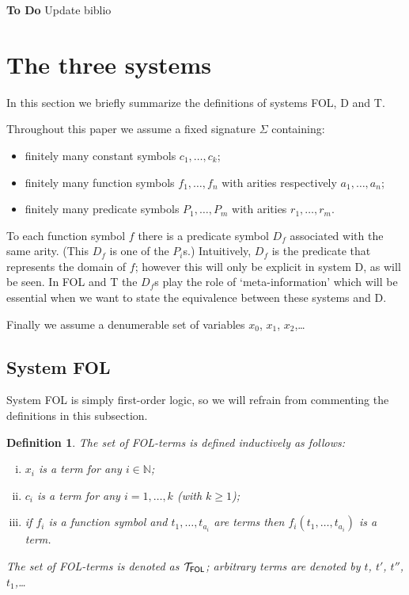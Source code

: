 \documentclass{article}
\newtheorem{definition}{Definition}[section]
\newcommand{\D}{\textsf D}
\newcommand{\T}{\textsf T}
\newcommand{\FOL}{\textsf{FOL}}
\newcommand{\NN}{\ensuremath{\mathbb N}}
\newcommand{\terms}[1]{\ensuremath{{\cal T}_{\mathsf{#1}}}}
\begin{document}
{\bf To Do} Update biblio


\section{The three systems}

In this section we briefly summarize the definitions of systems
{\FOL}, {\D} and {\T}.

Throughout this paper we assume a fixed signature $\Sigma$ containing:
\begin{itemize}
\item finitely many constant symbols $c_1,\ldots,c_k$;
\item finitely many function symbols $f_1,\ldots,f_n$ with arities
respectively $a_1,\ldots,a_n$;
\item finitely many predicate symbols $P_1,\ldots,P_m$ with arities
$r_1,\ldots,r_m$.
\end{itemize}

To each function symbol $f$ there is a predicate symbol $D_f$
associated with the same arity.  (This $D_f$ is one of the $P_i$s.)
Intuitively, $D_f$ is the predicate that represents the domain of $f$;
however this will only be explicit in system {\D}, as will be seen.
In {\FOL} and {\T} the $D_f$s play the role of `meta-information' which
will be essential when we want to state the equivalence between these
systems and {\D}.

Finally we assume a denumerable set of variables $x_0$, $x_1$, $x_2$,\ldots

\subsection{System {\FOL}}

System {\FOL} is simply first-order logic, so we will refrain from
commenting the definitions in this subsection.

\begin{definition}\label{defn:FOLterms}
The set of {\FOL}-terms is defined inductively as follows:
\begin{enumerate}[(i)]
\item $x_i$ is a term for any $i\in\NN$;
\item $c_i$ is a term for any $i=1,\ldots,k$ (with $k\geq1$);
\item if $f_i$ is a function symbol and $t_1,\ldots,t_{a_i}$ are terms
then $f_i(t_1,\ldots,t_{a_i})$ is a term.
\end{enumerate}
The set of {\FOL}-terms is denoted as {\terms{FOL}}; arbitrary terms are
denoted by $t$, $t'$, $t''$, $t_1$,\ldots
\end{definition}
\end{document}
